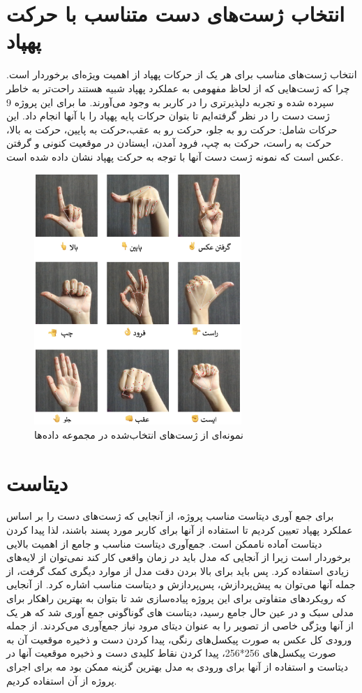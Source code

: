 \section{انتخاب ژست‌های دست متناسب با حرکت پهپاد}
انتخاب ژست‌های مناسب برای هر یک از حرکات پهپاد از اهمیت ویژه‌ای برخوردار است. چرا که ژست‌هایی که از لحاظ مفهومی به عملکرد پهپاد شبیه هستند راحت‌تر به خاطر سپرده شده و تجربه دلپذیرتری را در کاربر به وجود می‌آورند. 
ما برای این پروژه 9 ژست دست را در نظر گرفته‌ایم تا بتوان حرکات پایه پهپاد را با آنها انجام داد. این حرکات شامل: حرکت رو به جلو،  حرکت رو به عقب،حرکت به پایین، حرکت به بالا، حرکت به راست، حرکت به چپ، فرود آمدن، 
ایستادن در موقعیت کنونی و گرفتن عکس است که نمونه ژست دست آنها با توجه به حرکت پهپاد نشان داده شده است.

\begin{figure}[h]
    \centering
    \includegraphics[width=0.7\textwidth]{gestures.png}
    \caption{نمونه‌ای از ژست‌های انتخاب‌شده در مجموعه داده‌ها}
\end{figure}

\section{دیتاست}
برای جمع آوری دیتاست مناسب پروژه، از آنجایی که ژست‌های دست را بر اساس عملکرد پهپاد تعیین کردیم تا استفاده از آنها برای کاربر مورد پسند باشند، لذا پیدا کردن دیتاست آماده ناممکن است. جمع‌آوری دیتاست مناسب و جامع از اهمیت 
بالایی برخوردار است زیرا از آنجایی که مدل باید در زمان واقعی کار کند نمی‌توان از لایه‌های زیادی استفاده کرد. پس باید برای بالا بردن دقت مدل از موارد دیگری کمک گرفت، از جمله آنها می‌توان به پیش‌پردازش، پس‌پردازش و دیتاست مناسب اشاره کرد.
از آنجایی که رویکردهای متفاوتی برای این پروژه پیاده‌سازی شد تا بتوان به بهترین راهکار برای مدلی سبک و در عین حال جامع رسید، دیتاست های گوناگونی جمع آوری شد که هر یک از آنها  ویژگی خاصی از تصویر را به عنوان دیتای 
مرود نیاز جمع‌آوری می‌کردند. از جمله ورودی کل عکس به صورت پیکسل‌های رنگی، پیدا کردن دست و ذخیره موقعیت آن به صورت پیکسل‌های 256*256، پیدا کردن نقاط کلیدی دست و ذخیره موقعیت آنها
در دیتاست و استفاده از آنها برای ورودی به مدل بهترین گزینه ممکن بود مه برای اجرای پروژه از آن استفاده کردیم.


